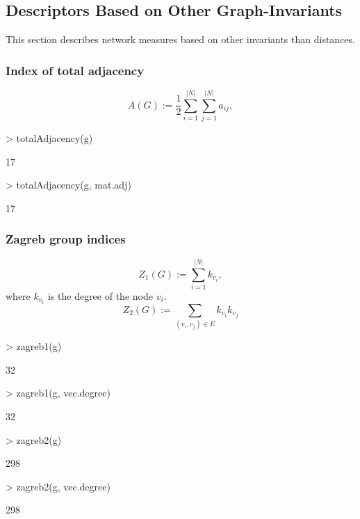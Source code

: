 \documentclass[a4paper]{article}
\begin{document}
\subsection{Descriptors Based on Other Graph-Invariants}
\label{sec:otherInv}
This section describes network measures based on other invariants than distances.


\subsubsection*{Index of total adjacency}
\begin{equation}
A(G):= \frac{1}{2} \sum_{i=1}^{|N|}\sum_{j=1}^{|N|}a_{ij},
\end{equation}
\begin{Schunk}
\begin{Sinput}
> totalAdjacency(g)
\end{Sinput}
\begin{Soutput}
[1] 17
\end{Soutput}
\begin{Sinput}
> totalAdjacency(g, mat.adj)
\end{Sinput}
\begin{Soutput}
[1] 17
\end{Soutput}
\end{Schunk}

\subsubsection*{Zagreb group indices}
\begin{equation}
Z_1(G):= \sum_{i=1}^{|N|} k_{v_i},
\end{equation}
where $k_{v_i}$ is the degree of the node $v_i$.
\begin{equation}
Z_2(G):= \sum_{(v_i,v_j) \in E} k_{v_i} k_{v_j}
\end{equation}
\begin{Schunk}
\begin{Sinput}
> zagreb1(g)
\end{Sinput}
\begin{Soutput}
[1] 32
\end{Soutput}
\begin{Sinput}
> zagreb1(g, vec.degree)
\end{Sinput}
\begin{Soutput}
[1] 32
\end{Soutput}
\begin{Sinput}
> zagreb2(g)
\end{Sinput}
\begin{Soutput}
[1] 298
\end{Soutput}
\begin{Sinput}
> zagreb2(g, vec.degree)
\end{Sinput}
\begin{Soutput}
[1] 298
\end{Soutput}
\end{Schunk}
\end{document}
